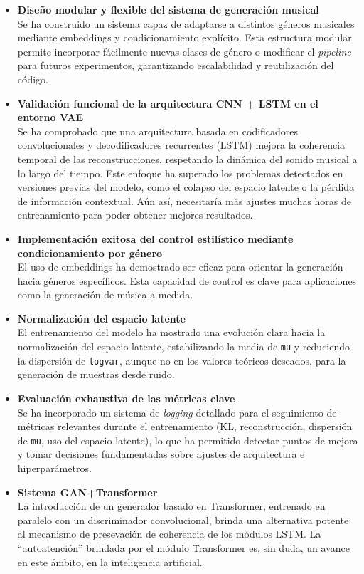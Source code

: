 \begin{itemize}
    \item \textbf{Diseño modular y flexible del sistema de generación musical} \\
    Se ha construido un sistema capaz de adaptarse a distintos géneros musicales mediante embeddings y condicionamiento explícito. Esta estructura modular permite incorporar fácilmente nuevas clases de género o modificar el \textit{pipeline} para futuros experimentos, garantizando escalabilidad y reutilización del código.

    \item \textbf{Validación funcional de la arquitectura CNN + LSTM en el entorno VAE} \\
    Se ha comprobado que una arquitectura basada en codificadores convolucionales y decodificadores recurrentes (LSTM) mejora la coherencia temporal de las reconstrucciones, respetando la dinámica del sonido musical a lo largo del tiempo. Este enfoque ha superado los problemas detectados en versiones previas del modelo, como el colapso del espacio latente o la pérdida de información contextual. Aún así, necesitaría más ajustes  muchas horas de entrenamiento para poder obtener mejores resultados.

    \item \textbf{Implementación exitosa del control estilístico mediante condicionamiento por género} \\
    El uso de embeddings ha demostrado ser eficaz para orientar la generación hacia géneros específicos. Esta capacidad de control es clave para aplicaciones como la generación de música a medida.

    \item \textbf{Normalización del espacio latente} \\
    El entrenamiento del modelo ha mostrado una evolución clara hacia la normalización del espacio latente, estabilizando la media de \texttt{mu} y reduciendo la dispersión de \texttt{logvar}, aunque no en los valores teóricos deseados, para la generación de muestras desde ruido.

    \item \textbf{Evaluación exhaustiva de las métricas clave} \\
    Se ha incorporado un sistema de \textit{logging} detallado para el seguimiento de métricas relevantes durante el entrenamiento (KL, reconstrucción, dispersión de \texttt{mu}, uso del espacio latente), lo que ha permitido detectar puntos de mejora y tomar decisiones fundamentadas sobre ajustes de arquitectura e hiperparámetros.

    \item \textbf{Sistema GAN+Transformer} \\
    La introducción de un generador basado en Transformer, entrenado en paralelo con un discriminador convolucional, brinda una alternativa potente al mecanismo de presevación de coherencia de los módulos LSTM. La ``autoatención'' brindada por el módulo Transformer es, sin duda, un avance en este ámbito, en la inteligencia artificial.
\end{itemize}

